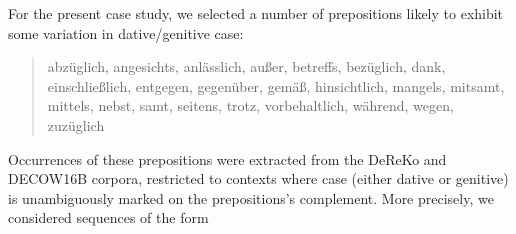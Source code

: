 
For the present case study, we selected a number of prepositions likely to exhibit some variation in dative/genitive case:
 
 \begin{quote} 
   abzüglich, angesichts, anlässlich, au{\ss}er, betreffs, bezüglich, dank, einschlie{\ss}lich, entgegen, gegenüber, gemä{\ss}, hinsichtlich, mangels, mitsamt, mittels, nebst, samt, seitens, trotz, vorbehaltlich, während, wegen, zuzüglich
 \end{quote}





Occurrences of these prepositions were extracted from the DeReKo and DECOW16B corpora, restricted to contexts where case (either dative or genitive) is unambiguously marked on the prepositions's complement.
 More precisely, we considered sequences of the form 
 
